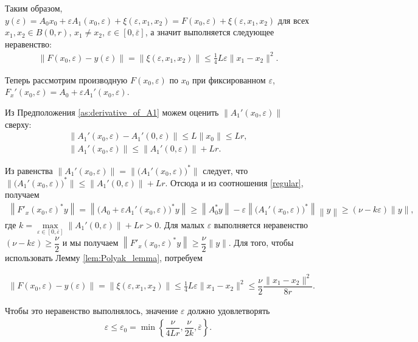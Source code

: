 \documentclass[../main.tex]{subfiles}
\begin{document}
Таким образом, $y(\varepsilon) = A_0x_0 + \varepsilon A_1(x_0,\varepsilon) + \xi(\varepsilon,x_1,x_2) = F(x_0,\varepsilon) + \xi(\varepsilon,x_1,x_2)$ для всех $x_1, x_2 \in B(0,r)$, $x_1 \neq x_2$, $\varepsilon \in [0, \overline{\varepsilon}]$, а значит выполняется следующее неравенство:
\begin{gather*}
 \| F(x_0,\varepsilon) - y(\varepsilon) \| = \|\xi(\varepsilon,x_1,x_2)\| \leqslant \frac{1}{4}L\varepsilon\|x_1-x_2\|^2.
\end{gather*}


Теперь рассмотрим производную $F(x_0, \varepsilon)$ по $x_0$ при фиксированном $\varepsilon$,\\ \mbox{$F_x'(x_0,\varepsilon) = A_0 + \varepsilon A_1'(x_0,\varepsilon) $}.

Из Предположения \ref{as:derivative_of_A1} можем оценить $\|A_1'(x_0,\varepsilon)\|$ сверху:
\begin{gather*}
 \|A_1'(x_0,\varepsilon) - A_1'(0,\varepsilon)\| \leqslant 
 L\|x_0\| \leqslant
 L r, \\
 \|A_1'(x_0,\varepsilon)\| \leqslant \| A_1'(0,\varepsilon)\| + Lr.
\end{gather*}

Из равенства $\|A_1'(x_0,\varepsilon)\| = \|\big(A_1'(x_0,\varepsilon)\big)^*\| $ следует, что $\|\big(A_1'(x_0,\varepsilon)\big)^*\| \leqslant \| A_1'(0,\varepsilon)\| + Lr$.
Отсюда и из соотношения \eqref{regular}, получаем 
\begin{gather*}
 \left\|F'_x(x_0, \varepsilon)^* y\right\| = \left\|\big(A_0 + \varepsilon A_1'(x_0, \varepsilon)\big)^* y\right\| \geqslant \left\|A_0^*y \right\| - \varepsilon \left\|\big(A_1'(x_0,\varepsilon)\big)^*\right\| \left\|y\right\| \geqslant (\nu - k\varepsilon)\|y\|,
\end{gather*} где $k = \max\limits_{\varepsilon \in [0,\overline{\varepsilon}]}\| A_1'(0,\varepsilon)\| + Lr > 0$.
Для малых $\varepsilon$ выполняется неравенство $(\nu - k\varepsilon) \geqslant \dfrac{\nu}{2}$ и мы получаем $\left\|F'_x(x_0, \varepsilon)^* y\right\| \geqslant \dfrac{\nu}{2} \|y\|$. 
Для того, чтобы использовать Лемму \ref{lem:Polyak_lemma}, потребуем

\begin{gather*}
 \| F(x_0,\varepsilon) - y(\varepsilon) \| = \|\xi(\varepsilon,x_1,x_2)\| \leqslant \frac{1}{4}L\varepsilon\|x_1-x_2\|^2 \leqslant \dfrac{\nu}{2} \dfrac{\|x_1-x_2\|^2}{8r}.
\end{gather*}

Чтобы это неравенство выполнялось, значение $\varepsilon$ должно удовлетворять 
\begin{gather}
 \varepsilon \leqslant \varepsilon_0 = \min\left\{\dfrac{\nu}{4Lr}, \dfrac{\nu}{2k}, \overline{\varepsilon}\right\}.
\end{gather} 
\end{document}
